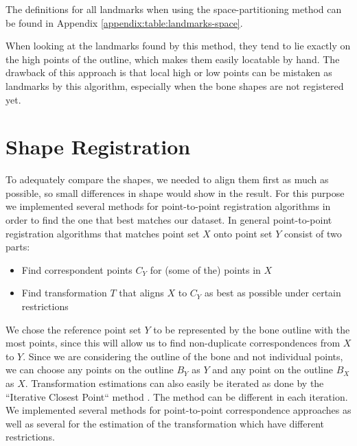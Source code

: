 \documentclass[pdftex,12pt,a4paper]{report}
\begin{document}
The definitions for all landmarks when using the space-partitioning method can be found in Appendix
\ref{appendix:table:landmarks-space}.

When looking at the landmarks found by this method, they tend to lie exactly on the high points of the outline, which
makes them easily locatable by hand. The drawback of this approach is that local high or low points can be mistaken as
landmarks by this algorithm, especially when the bone shapes are not registered yet.

\section{Shape Registration}

To adequately compare the shapes, we needed to align them first as much as possible, so small differences in shape would
show in the result. For this purpose we implemented several methods for point-to-point registration algorithms in order
to find the one that best matches our dataset. In general point-to-point registration algorithms that matches point set
$X$ onto point set $Y$ consist of two parts:

\begin{itemize}
\item Find correspondent points $C_Y$ for (some of the) points in $X$
\item Find transformation $T$ that aligns $X$ to $C_Y$ as best as possible under certain restrictions
\end{itemize}

We chose the reference point set $Y$ to be represented by the bone outline with the most points, since this will allow
us to find non-duplicate correspondences from $X$ to $Y$. Since we are considering the outline of the bone and not
individual points, we can choose any points on the outline $B_Y$ as $Y$ and any point on the outline $B_X$ as $X$.
Transformation estimations can also easily be iterated as done by the ``Iterative Closest Point`` method \cite{besl1992method}.
The method can be different in each iteration. We implemented several methods for point-to-point correspondence
approaches as well as several for the estimation of the transformation which have different restrictions.
\end{document}
